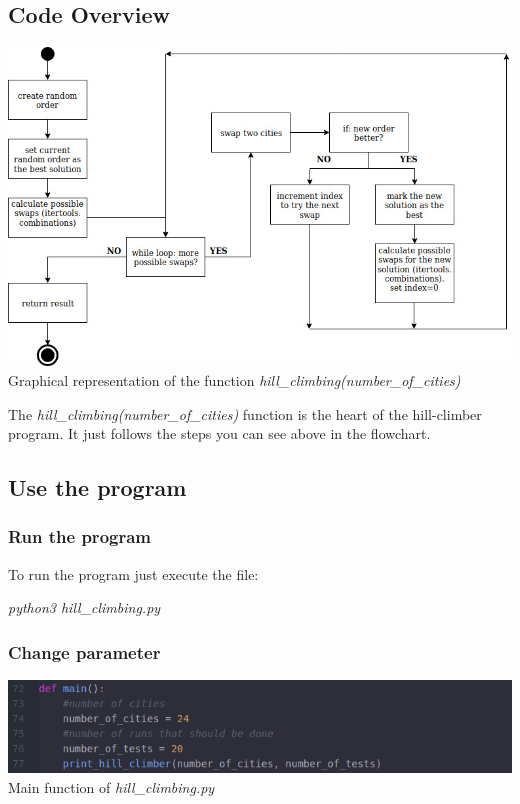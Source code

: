 \documentclass[10pt,a4paper]{article}
\begin{document}
	\subsection{Code Overview}
	\begin{center}
		\includegraphics[width=1\linewidth]{pictures/hillClimbing/hill_climbing}
		\\
		Graphical representation of the function \textit{hill\_climbing(number\_of\_cities)}
		\\
	\end{center}
	The \textit{hill\_climbing(number\_of\_cities)} function is the heart of the hill-climber program. It just follows the steps you can see above in the flowchart. 
	\subsection{Use the program}
	\subsubsection{Run the program}
	To run the program just execute the file: 
	\begin{center}
		\textit{python3 hill\_climbing.py}
	\end{center}
	\subsubsection{Change parameter}
	\begin{center}
		\includegraphics[width=1.0\linewidth]{pictures/hillClimbing/parameter}
		\\
		Main function of \textit{hill\_climbing.py}
		\\
	\end{center}
\end{document}
